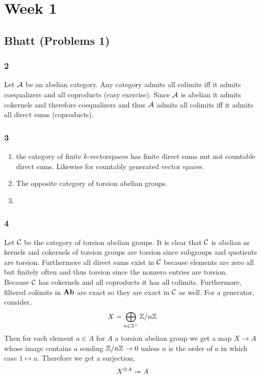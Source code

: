 \documentclass[12pt]{article}
\begin{document}
\section{Week 1}

\subsection{Bhatt (Problems 1)}

\subsubsection*{2}

Let $\mathcal{A}$ be an abelian category. Any category admits all colimits iff it admits coequalizers and all coproducts (easy exercise). Since $\mathcal{A}$ is abelian it admits cokernels and therefore coequalizers and thus $\mathcal{A}$ admits all colimits iff it admits all direct sums (coproducts).

\subsubsection*{3}

\begin{enumerate}
\item the category of finite $k$-vectorspaces has finite direct sums nut not countable direct sums. Likewise for countably generated vector spaces.

\item The opposite category of torsion abelian groups.

\item 
\end{enumerate}

\subsubsection*{4}

Let $\mathcal{C}$ be the category of torsion abelian groups. It is clear that $\mathcal{C}$ is abelian as kernels and cokernels of torsion groups are torsion since subgroups and quotients are torsion. Furthermore all direct sums exist in $\mathcal{C}$ because elements are zero all but finitely often and thus torsion since the nonzero entries are torsion.
\bigskip\\
Because $\mathcal{C}$ has cokernels and all coproducts it has all colimits. Furthermore, filtered colimits in $\mathbf{Ab}$ are exact so they are exact in $\mathcal{C}$ as well. For a generator, consider,
\[ X = \bigoplus_{n \in \mathbb{Z}^+} \mathbb{Z} / n \mathbb{Z} \]
Then for each element $a \in A$ for $A$ a torsion abelian group we get a map $X \to A$ whose image contains $a$ sending $\mathbb{Z} / n \mathbb{Z} \to 0$ unless $n$ is the order of $a$ in which case $1 \mapsto a$. Therefore we get a surjection,
\[ X^{\oplus A} \twoheadrightarrow A \]
\end{document}

